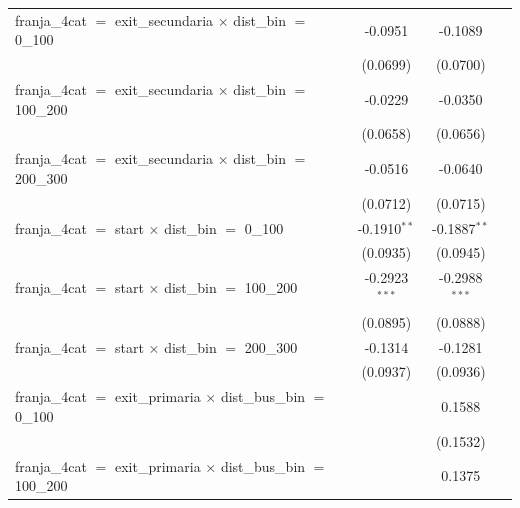 \begin{tabular}{lccc}
   franja\_4cat $=$ exit\_secundaria $\times$ dist\_bin $=$ 0\_100                 & -0.0951         & -0.1089              &   \\   
                                                                                   & (0.0699)        & (0.0700)             &   \\   
   franja\_4cat $=$ exit\_secundaria $\times$ dist\_bin $=$ 100\_200               & -0.0229         & -0.0350              &   \\   
                                                                                   & (0.0658)        & (0.0656)             &   \\   
   franja\_4cat $=$ exit\_secundaria $\times$ dist\_bin $=$ 200\_300               & -0.0516         & -0.0640              &   \\   
                                                                                   & (0.0712)        & (0.0715)             &   \\   
   franja\_4cat $=$ start $\times$ dist\_bin $=$ 0\_100                            & -0.1910$^{**}$  & -0.1887$^{**}$       &   \\   
                                                                                   & (0.0935)        & (0.0945)             &   \\   
   franja\_4cat $=$ start $\times$ dist\_bin $=$ 100\_200                          & -0.2923$^{***}$ & -0.2988$^{***}$      &   \\   
                                                                                   & (0.0895)        & (0.0888)             &   \\   
   franja\_4cat $=$ start $\times$ dist\_bin $=$ 200\_300                          & -0.1314         & -0.1281              &   \\   
                                                                                   & (0.0937)        & (0.0936)             &   \\   
   franja\_4cat $=$ exit\_primaria $\times$ dist\_bus\_bin $=$ 0\_100              &                 & 0.1588               &   \\   
                                                                                   &                 & (0.1532)             &   \\   
   franja\_4cat $=$ exit\_primaria $\times$ dist\_bus\_bin $=$ 100\_200            &                 & 0.1375               &   \\   

\end{tabular}
